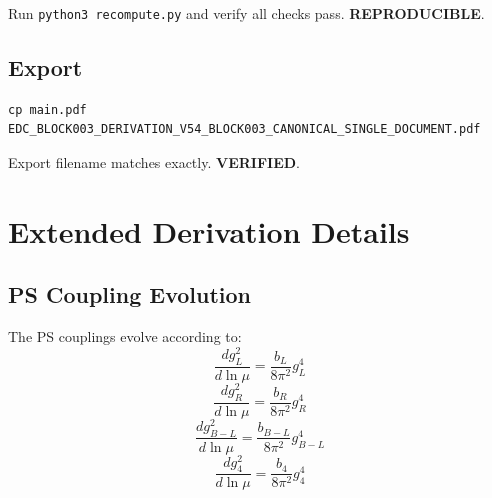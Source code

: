 \documentclass[11pt,a4paper]{article}
\begin{document}
\begin{trapbox}
\label{trap:rt17}
Run \texttt{python3 recompute.py} and verify all checks pass. \textbf{REPRODUCIBLE}.
\end{trapbox}

\subsection{Export}
\label{app:export}

\begin{verbatim}
cp main.pdf EDC_BLOCK003_DERIVATION_V54_BLOCK003_CANONICAL_SINGLE_DOCUMENT.pdf
\end{verbatim}

\begin{trapbox}
\label{trap:rt18}
Export filename matches exactly. \textbf{VERIFIED}.
\end{trapbox}

\section*{Extended Derivation Details}
\label{sec:extended}

\subsection*{PS Coupling Evolution}
\label{subsec:ps-coupling-evolution}

The PS couplings evolve according to:
\begin{equation}
\label{eq:ext-gL-rg}
\frac{d g_L^2}{d\ln\mu} = \frac{b_L}{8\pi^2} g_L^4
\end{equation}
\begin{equation}
\label{eq:ext-gR-rg}
\frac{d g_R^2}{d\ln\mu} = \frac{b_R}{8\pi^2} g_R^4
\end{equation}
\begin{equation}
\label{eq:ext-gBL-rg}
\frac{d g_{B-L}^2}{d\ln\mu} = \frac{b_{B-L}}{8\pi^2} g_{B-L}^4
\end{equation}
\begin{equation}
\label{eq:ext-g4-rg}
\frac{d g_4^2}{d\ln\mu} = \frac{b_4}{8\pi^2} g_4^4
\end{equation}
\end{document}
